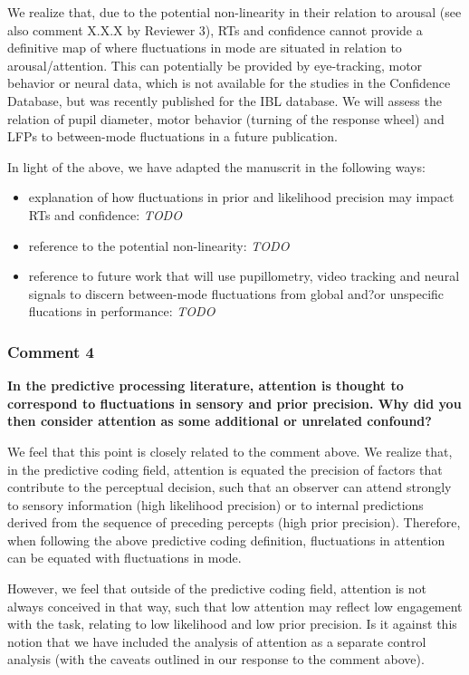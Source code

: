 \documentclass[
]{article}
\begin{document}
We realize that, due to the potential non-linearity in their relation to
arousal (see also comment X.X.X by Reviewer 3), RTs and confidence
cannot provide a definitive map of where fluctuations in mode are
situated in relation to arousal/attention. This can potentially be
provided by eye-tracking, motor behavior or neural data, which is not
available for the studies in the Confidence Database, but was recently
published for the IBL database. We will assess the relation of pupil
diameter, motor behavior (turning of the response wheel) and LFPs to
between-mode fluctuations in a future publication.

In light of the above, we have adapted the manuscrit in the following
ways:

\begin{itemize}
\item
  explanation of how fluctuations in prior and likelihood precision may
  impact RTs and confidence: \emph{TODO}
\item
  reference to the potential non-linearity: \emph{TODO}
\item
  reference to future work that will use pupillometry, video tracking
  and neural signals to discern between-mode fluctuations from global
  and?or unspecific flucations in performance: \emph{TODO}
\end{itemize}

\hypertarget{comment-4}{%
\subsubsection{Comment 4}\label{comment-4}}

\textbf{In the predictive processing literature, attention is thought to
correspond to fluctuations in sensory and prior precision. Why did you
then consider attention as some additional or unrelated confound?}

We feel that this point is closely related to the comment above. We
realize that, in the predictive coding field, attention is equated the
precision of factors that contribute to the perceptual decision, such
that an observer can attend strongly to sensory information (high
likelihood precision) or to internal predictions derived from the
sequence of preceding percepts (high prior precision). Therefore, when
following the above predictive coding definition, fluctuations in
attention can be equated with fluctuations in mode.

However, we feel that outside of the predictive coding field, attention
is not always conceived in that way, such that low attention may reflect
low engagement with the task, relating to low likelihood and low prior
precision. Is it against this notion that we have included the analysis
of attention as a separate control analysis (with the caveats outlined
in our response to the comment above).
\end{document}

